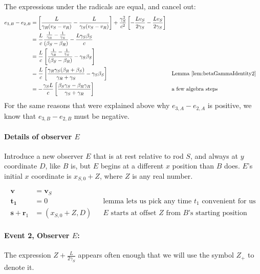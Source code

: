 \documentclass[a4paper]{article}
\theoremstyle{plain}
\theoremstyle{definition}
\newcommand{\vect}[1]{\mathbf{#1}}
\begin{document}
The expressions under the radicals are equal, and cancel out:
\begin{align}
e_{3,B}-e_{2,B}
  & = \left[ \frac{L}{\gamma_R(v_S - v_R)} - \frac{L}{\gamma_S(v_S - v_R)} \right] + \frac{\gamma_S^2}{c^2} \left[ -\frac{Lv_S}{2\gamma_S} - \frac{Lv_S}{2\gamma_S} \right] \nonumber \\
  & = \frac{L}{c} \frac{\frac{1}{\gamma_R} - \frac{1}{\gamma_S}}{(\beta_S - \beta_R)} - \frac{L\gamma_S\beta_S}{c} \nonumber \\
  & = \frac{L}{c} \left[ \frac{\frac{1}{\gamma_R} - \frac{1}{\gamma_S}}{(\beta_S - \beta_R)} - \gamma_S\beta_S \right] \label{eqn:scen2b-observerB-step1} \\
  & = \frac{L}{c} \left[ \frac{\gamma_R\gamma_S(\beta_R+\beta_S)}{\gamma_R+\gamma_S} - \gamma_S\beta_S \right] & & \text{Lemma~\ref{lem:betaGammaIdentity2}} \nonumber \\
  & = -\frac{\gamma_S L}{c} \left[ \frac{\beta_S\gamma_S - \beta_R\gamma_R}{\gamma_S + \gamma_R} \right] & & \text{a few algebra steps} \label{eqn:scen2b-observerB-finalstep}
\end{align}
For the same reasons that were explained above why $e_{3,A}-e_{2,A}$
is positive, we know that $e_{3,B}-e_{2,B}$ must be negative.


\paragraph{Details of observer $E$}

Introduce a new observer $E$ that is at rest relative to rod $S$, and
always at $y$ coordinate $D$, like $B$ is, but $E$ begins at a
different $x$ position than $B$ does.  $E$'s initial $x$ coordinate is
$x_{S,0} + Z$, where $Z$ is any real number.

\begin{align}
\vect{v} & = \vect{v}_S \\
\vect{t_1} & = 0 & & \text{lemma lets us pick any time $t_1$ convenient for us} \\
\vect{s} + \vect{r}_1 & = (x_{S,0} + Z, D) & & \text{$E$ starts at offset $Z$ from $B$'s starting position}
\end{align}


\paragraph{Event 2, Observer $E$:}

The expression $Z + \frac{L}{2\gamma_S}$ appears often enough that we
will use the symbol $Z_{+}$ to denote it.
\end{document}
